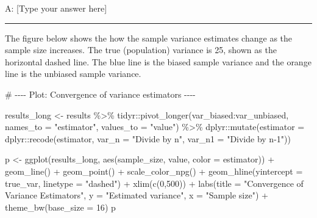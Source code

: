\documentclass[
  12pt,
  letterpaper,
]{scrbook}
\newenvironment{Shaded}{\begin{snugshade}}{\end{snugshade}}
\newcommand{\AttributeTok}[1]{\textcolor[rgb]{0.40,0.45,0.13}{#1}}
\newcommand{\CommentTok}[1]{\textcolor[rgb]{0.37,0.37,0.37}{#1}}
\newcommand{\DecValTok}[1]{\textcolor[rgb]{0.68,0.00,0.00}{#1}}
\newcommand{\FunctionTok}[1]{\textcolor[rgb]{0.28,0.35,0.67}{#1}}
\newcommand{\NormalTok}[1]{\textcolor[rgb]{0.00,0.23,0.31}{#1}}
\newcommand{\OtherTok}[1]{\textcolor[rgb]{0.00,0.23,0.31}{#1}}
\newcommand{\SpecialCharTok}[1]{\textcolor[rgb]{0.37,0.37,0.37}{#1}}
\newcommand{\StringTok}[1]{\textcolor[rgb]{0.13,0.47,0.30}{#1}}
\theoremstyle{plain}
\theoremstyle{definition}
\theoremstyle{remark}
\begin{document}
A: {[}Type your answer here{]}

\begin{center}\rule{0.5\linewidth}{0.5pt}\end{center}

The figure below shows the how the sample variance estimates change as
the sample size increases. The true (population) variance is 25, shown
as the horizontal dashed line. The blue line is the biased sample
variance and the orange line is the unbiased sample variance.

\begin{Shaded}
\begin{Highlighting}[]
\CommentTok{\# {-}{-}{-}{-} Plot: Convergence of variance estimators {-}{-}{-}{-}}

\NormalTok{results\_long }\OtherTok{\textless{}{-}}\NormalTok{ results }\SpecialCharTok{\%\textgreater{}\%}
\NormalTok{  tidyr}\SpecialCharTok{::}\FunctionTok{pivot\_longer}\NormalTok{(var\_biased}\SpecialCharTok{:}\NormalTok{var\_unbiased, }\AttributeTok{names\_to =} \StringTok{"estimator"}\NormalTok{, }\AttributeTok{values\_to =} \StringTok{"value"}\NormalTok{) }\SpecialCharTok{\%\textgreater{}\%}
\NormalTok{  dplyr}\SpecialCharTok{::}\FunctionTok{mutate}\NormalTok{(}\AttributeTok{estimator =}\NormalTok{ dplyr}\SpecialCharTok{::}\FunctionTok{recode}\NormalTok{(estimator, }\AttributeTok{var\_n =} \StringTok{"Divide by n"}\NormalTok{, }\AttributeTok{var\_n1 =} \StringTok{"Divide by n{-}1"}\NormalTok{))}

\NormalTok{p }\OtherTok{\textless{}{-}} \FunctionTok{ggplot}\NormalTok{(results\_long, }\FunctionTok{aes}\NormalTok{(sample\_size, value, }\AttributeTok{color =}\NormalTok{ estimator)) }\SpecialCharTok{+}
  \FunctionTok{geom\_line}\NormalTok{() }\SpecialCharTok{+}
  \FunctionTok{geom\_point}\NormalTok{() }\SpecialCharTok{+}
  \FunctionTok{scale\_color\_npg}\NormalTok{() }\SpecialCharTok{+}
  \FunctionTok{geom\_hline}\NormalTok{(}\AttributeTok{yintercept =}\NormalTok{ true\_var, }\AttributeTok{linetype =} \StringTok{"dashed"}\NormalTok{) }\SpecialCharTok{+}
  \FunctionTok{xlim}\NormalTok{(}\FunctionTok{c}\NormalTok{(}\DecValTok{0}\NormalTok{,}\DecValTok{500}\NormalTok{)) }\SpecialCharTok{+}
  \FunctionTok{labs}\NormalTok{(}\AttributeTok{title =} \StringTok{"Convergence of Variance Estimators"}\NormalTok{, }\AttributeTok{y =} \StringTok{"Estimated variance"}\NormalTok{, }\AttributeTok{x =} \StringTok{"Sample size"}\NormalTok{) }\SpecialCharTok{+}
  \FunctionTok{theme\_bw}\NormalTok{(}\AttributeTok{base\_size =} \DecValTok{16}\NormalTok{)}
\NormalTok{p}
\end{Highlighting}
\end{Shaded}
\end{document}
